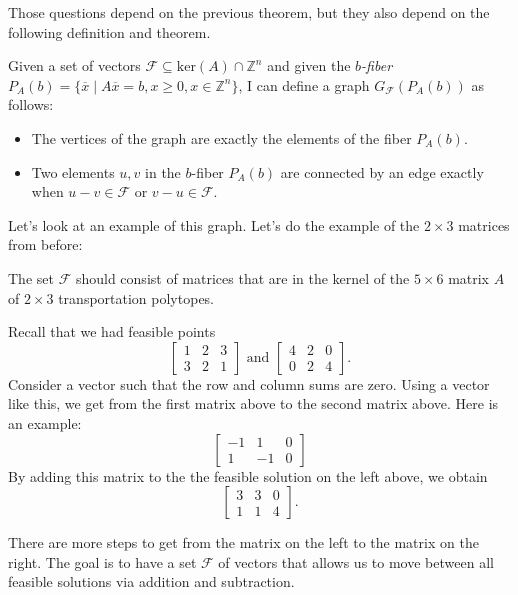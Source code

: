 Those questions depend on the previous theorem, but they also depend on the following definition and theorem.
\begin{definition}
Given a set of vectors $\mathcal{F} \subseteq \text{ker}(A) \cap \mathbb{Z}^n$ and given
 the \textit{$b$-fiber} $P_A(b) = \{\overline{x} \mid A\overline{x} = b, x \geq 0, x \in \mathbb{Z}^n\}$,
  I can define a graph $G_{\mathcal{F}}(P_A(b))$ as follows:
\begin{itemize}
\item The vertices of the graph are exactly the elements of the fiber $P_A(b)$.
\item Two elements $u, v$ in the $b$-fiber $P_A(b)$ are connected by an edge exactly when $u-v \in \mathcal{F}$ or $v-u \in \mathcal{F}$.
\end{itemize}
\end{definition}
Let's look at an example of this graph. Let's do the example of the $2 \times 3$ matrices from before:
\begin{example}
The set $\mathcal{F}$ should consist of matrices that are in the kernel of the $5 \times 6$ matrix $A$ of $2 \times 3$ transportation polytopes.

Recall that we had feasible points
\[
\left[
\begin{array}{ccc}
1&2&3 \\ 3 & 2&1
\end{array}
\right]
\text{ and }
\left[
\begin{array}{ccc}
4&2&0\\0&2&4
\end{array}
\right]
.\]
Consider a vector such that the row and column sums are zero.  Using a vector like this, we  get from the first matrix above to the second matrix above. Here is an example:
\[ \left[
\begin{array}{ccc}
-1&1&0\\1&-1&0
\end{array}
\right]
\]
By adding this matrix to the the feasible solution on the left above, we obtain
\[
\left[
\begin{array}{ccc}
3&3&0\\1&1&4
\end{array}
\right]
.\]

There are  more steps to get from the matrix on the left to the matrix on the right. The goal is to have a set $\mathcal{F}$ of vectors that allows us to move between all feasible solutions via addition and subtraction.
\end{example}

